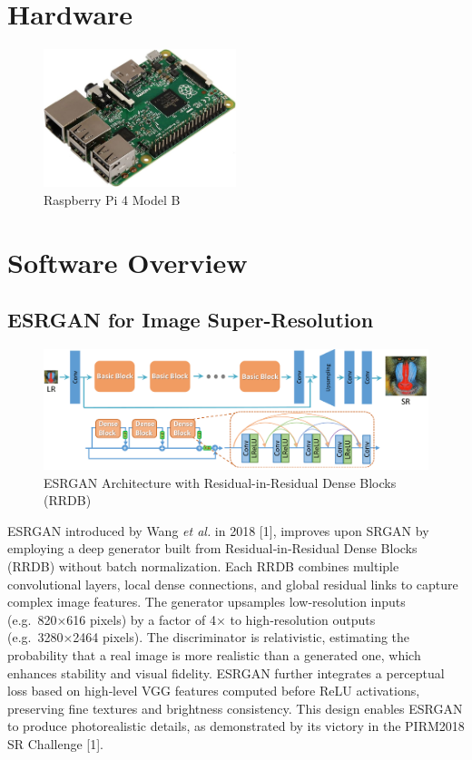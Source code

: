 \section{Hardware}
\lipsum[4-8]
\begin{figure}
\centering
\includegraphics[width=0.5\textwidth]{images/raspimg.jpg}
\caption{Raspberry Pi 4 Model B}

\end{figure}

\section{Software Overview}

\subsection{ESRGAN for Image Super-Resolution}
\begin{figure}[H]
    \centering
    \includegraphics[width=0.85\linewidth]{images/esrganarchi.png}
    \caption{ESRGAN Architecture with Residual-in-Residual Dense Blocks (RRDB)}
    \label{fig:esrgan}
\end{figure}
ESRGAN introduced by Wang \emph{et al.} in 2018 [1], improves upon SRGAN by employing a deep generator built from Residual‑in‑Residual Dense Blocks (RRDB) without batch normalization. Each RRDB combines multiple convolutional layers, local dense connections, and global residual links to capture complex image features. The generator upsamples low‑resolution inputs (e.g.\ 820×616 pixels) by a factor of 4× to high‑resolution outputs (e.g.\ 3280×2464 pixels). The discriminator is relativistic, estimating the probability that a real image is more realistic than a generated one, which enhances stability and visual fidelity. ESRGAN further integrates a perceptual loss based on high‑level VGG features computed before ReLU activations, preserving fine textures and brightness consistency. This design enables ESRGAN to produce photorealistic details, as demonstrated by its victory in the PIRM2018 SR Challenge [1].

